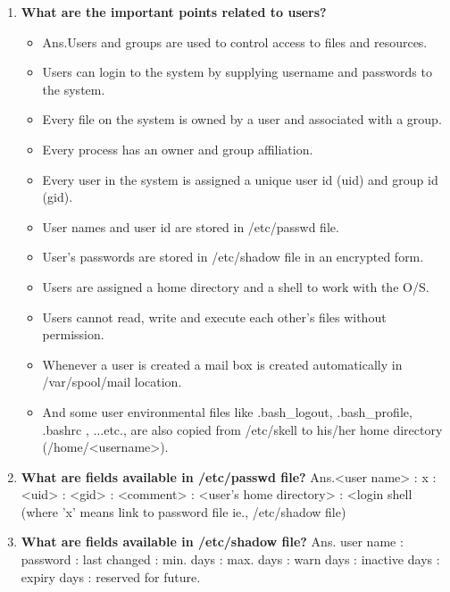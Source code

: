 \begin{enumerate}
    \item \textbf{What are the important points related to users?}
    \begin {itemize}
	    \item Ans.Users and groups are used to control access to files and resources.
	    \item Users can login to the system by supplying username and passwords to the system.
	    \item Every file on the system is owned by a user and associated with a group.
	    \item Every process has an owner and group affiliation.
	    \item Every user in the system is assigned a unique user id (uid) and group id (gid).
	    \item User names and user id are stored in  /etc/passwd file.
	    \item User's passwords are stored in  /etc/shadow  file in an encrypted form.
	    \item Users are assigned a home directory and a shell to work with the O/S.
	    \item Users cannot read, write and execute each other's files without permission.
	    \item Whenever a user is created a mail box is created automatically in /var/spool/mail location.
	    \item And some user environmental files like  .bash\_logout,  .bash\_profile,  .bashrc ,  ...etc., are also copied from /etc/skell   to  his/her home directory (/home/<username>).
	\end{itemize}    
    
    \bigskip
    \bigskip

    \item \textbf{What are fields available in  /etc/passwd file?}
    \newline
    Ans.<user name>   :   x   :   <uid>   :   <gid>   :   <comment>   :
         <user's home directory>  :   <login shell
         (where   'x'   means link to password file ie.,  /etc/shadow   file)

    \bigskip
    \bigskip

    \item \textbf {What are fields available in  /etc/shadow  file?}
    \newline
    Ans. user name : password : last changed : min. days : max. days : warn days : inactive days : expiry days : reserved  for future.


\end{enumerate}
